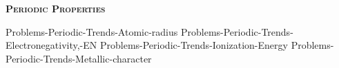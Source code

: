 \documentclass[main.tex]{subfiles}
\newcommand\chapterlabel{Ch-Table}
\begin{document}
\begin{multicols*}{2}
{{\raggedright\textsc{\textbf{Periodic Properties }}\par}
  {Problems-Periodic-Trends-Atomic-radius}
  {Problems-Periodic-Trends-Electronegativity,-EN}
  {Problems-Periodic-Trends-Ionization-Energy}
  {Problems-Periodic-Trends-Metallic-character}
\renewcommand\chapterlabel{Ch-Table}
}{}

\end{multicols*} \iftoggle{showfinalanswers}{
\newpage\fancyhfoffset[E,O]{0pt}
\begin{answerbox}
\begin{answersenvironment}
 \begin{localsize}{10}
{ \checkoddpage\ifoddpage    \else   \clearpage\thispagestyle{empty}\mbox{}\clearpage\fi
\Large \bf Answers}
\SetupExSheets{ headings = inline-nr , counter-format = qu) ,}
\printsolutions 
  \vspace{20cm}
 \end{localsize}
 \end{answersenvironment}
\end{answerbox}
}{}
\checkoddpage\ifoddpage   \clearpage\thispagestyle{empty}\mbox{}\clearpage \else   \fi
\end{document}
